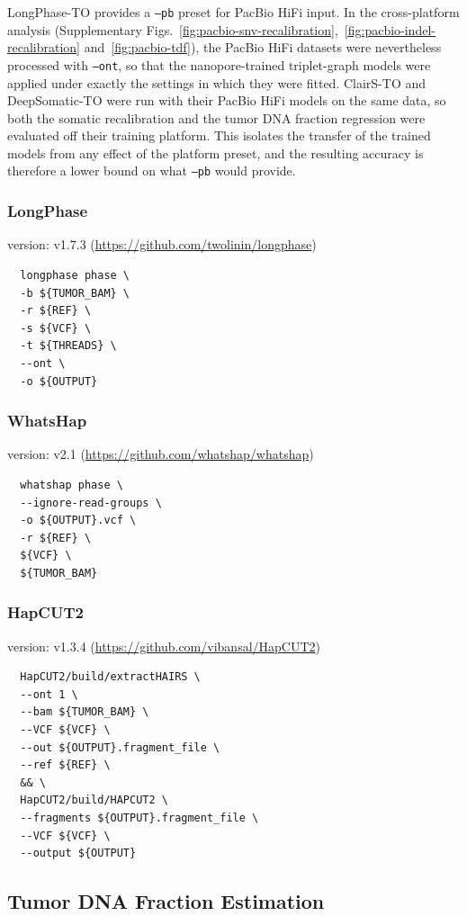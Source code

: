 \documentclass[pdflatex,sn-nature]{sn-jnl}
\begin{document}
\noindent LongPhase-TO provides a \texttt{--pb} preset for PacBio HiFi input. In the cross-platform analysis (Supplementary Figs.~\ref{fig:pacbio-snv-recalibration},~\ref{fig:pacbio-indel-recalibration} and~\ref{fig:pacbio-tdf}), the PacBio HiFi datasets were nevertheless processed with \texttt{--ont}, so that the nanopore-trained triplet-graph models were applied under exactly the settings in which they were fitted. ClairS-TO and DeepSomatic-TO were run with their PacBio HiFi models on the same data, so both the somatic recalibration and the tumor DNA fraction regression were evaluated off their training platform. This isolates the transfer of the trained models from any effect of the platform preset, and the resulting accuracy is therefore a lower bound on what \texttt{--pb} would provide.

\subsubsection{LongPhase}
version: v1.7.3 (\url{https://github.com/twolinin/longphase})
\label{supp:longphase}
\begin{verbatim}
  longphase phase \
  -b ${TUMOR_BAM} \
  -r ${REF} \
  -s ${VCF} \
  -t ${THREADS} \
  --ont \
  -o ${OUTPUT}
\end{verbatim}

\subsubsection{WhatsHap}
version: v2.1 (\url{https://github.com/whatshap/whatshap})
\label{supp:whatshap}
\begin{verbatim}
  whatshap phase \
  --ignore-read-groups \
  -o ${OUTPUT}.vcf \
  -r ${REF} \
  ${VCF} \
  ${TUMOR_BAM}
\end{verbatim}

\subsubsection{HapCUT2}
version: v1.3.4 (\url{https://github.com/vibansal/HapCUT2})
\label{supp:hapcut2}
\begin{verbatim}
  HapCUT2/build/extractHAIRS \
  --ont 1 \
  --bam ${TUMOR_BAM} \
  --VCF ${VCF} \
  --out ${OUTPUT}.fragment_file \
  --ref ${REF} \
  && \
  HapCUT2/build/HAPCUT2 \
  --fragments ${OUTPUT}.fragment_file \
  --VCF ${VCF} \
  --output ${OUTPUT}
\end{verbatim}

\subsection{Tumor DNA Fraction Estimation}
\end{document}
